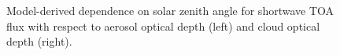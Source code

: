 \documentclass[12pt]{article}
\begin{document}
\begin{figure}[h!]
    \centering
    \begin{center}
    \end{center}
    \caption{Model-derived dependence on solar zenith angle for shortwave TOA flux with respect to aerosol optical depth (left) and cloud optical depth (right).}
    \label{szadep}
\end{figure}



\end{document}
